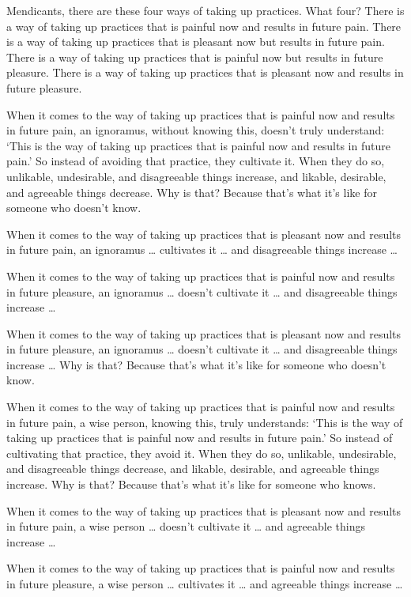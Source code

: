 \documentclass[12pt,openany]{book}%
\begin{document}
Mendicants, there are these four ways of taking up practices. What four? There is a way of taking up practices that is painful now and results in future pain. There is a way of taking up practices that is pleasant now but results in future pain. There is a way of taking up practices that is painful now but results in future pleasure. There is a way of taking up practices that is pleasant now and results in future pleasure. 

When it comes to the way of taking up practices that is painful now and results in future pain, an ignoramus, without knowing this, doesn’t truly understand: ‘This is the way of taking up practices that is painful now and results in future pain.’ So instead of avoiding that practice, they cultivate it. When they do so, unlikable, undesirable, and disagreeable things increase, and likable, desirable, and agreeable things decrease. Why is that? Because that’s what it’s like for someone who doesn’t know. 

When it comes to the way of taking up practices that is pleasant now and results in future pain, an ignoramus … cultivates it … and disagreeable things increase … 

When it comes to the way of taking up practices that is painful now and results in future pleasure, an ignoramus … doesn’t cultivate it … and disagreeable things increase … 

When it comes to the way of taking up practices that is pleasant now and results in future pleasure, an ignoramus … doesn’t cultivate it … and disagreeable things increase … Why is that? Because that’s what it’s like for someone who doesn’t know. 

When it comes to the way of taking up practices that is painful now and results in future pain, a wise person, knowing this, truly understands: ‘This is the way of taking up practices that is painful now and results in future pain.’ So instead of cultivating that practice, they avoid it. When they do so, unlikable, undesirable, and disagreeable things decrease, and likable, desirable, and agreeable things increase. Why is that? Because that’s what it’s like for someone who knows. 

When it comes to the way of taking up practices that is pleasant now and results in future pain, a wise person … doesn’t cultivate it … and agreeable things increase … 

When it comes to the way of taking up practices that is painful now and results in future pleasure, a wise person … cultivates it … and agreeable things increase … 
\end{document}
